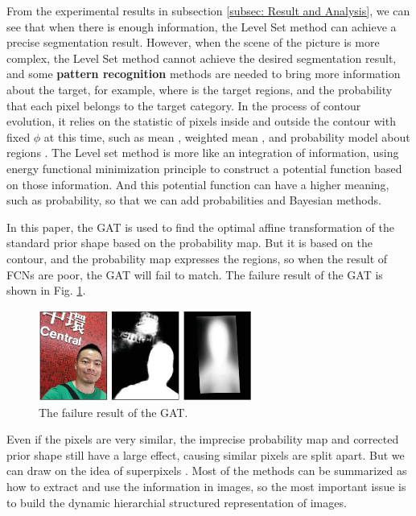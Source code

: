 From the experimental results in subsection \ref{subsec: Result and Analysis}, we can see that when there is enough information, the Level Set method can achieve a precise segmentation result. However, when the scene of the picture is more complex, the Level Set method cannot achieve the desired segmentation result, and some \textbf{pattern recognition} methods are needed to bring more information about the target, for example, where is the target regions, and the probability that each pixel belongs to the target category. In the process of contour evolution, it relies on the statistic of pixels inside and outside the contour with fixed $\phi$ at this time, such as mean \cite{LevelSet:chan2001active}, weighted mean \cite{LevelSet:mathod:li2008minimization}, and probability model about regions \cite{LevelSet:Discussion:lin2005probability}. The Level set method is more like an integration of information, using energy functional minimization principle to construct a potential function based on those information. And this potential function can have a higher meaning, such as probability, so that we can add probabilities and Bayesian methods.

In this paper, the GAT is used to find the optimal affine transformation of the standard prior shape based on the probability map. But it is based on the contour, and the probability map expresses the regions, so when the result of FCNs are poor, the GAT will fail to match. The failure result of the GAT is shown in Fig. \ref{fig: The failure result of the GAT}.
\begin{figure}[h]
    \centering
    \includegraphics[width=7cm]{figs/GAT_Failed.eps}
    \caption{The failure result of the GAT.}
    \label{fig: The failure result of the GAT}
\end{figure}

Even if the pixels are very similar, the imprecise probability map and corrected prior shape still have a large effect, causing similar pixels are split apart. But we can draw on the idea of superpixels \cite{LevelSet:superpixels:achanta2012slic}. Most of the methods can be summarized as how to extract and use the information in images, so the most important issue is to build the dynamic hierarchial structured representation of images. 